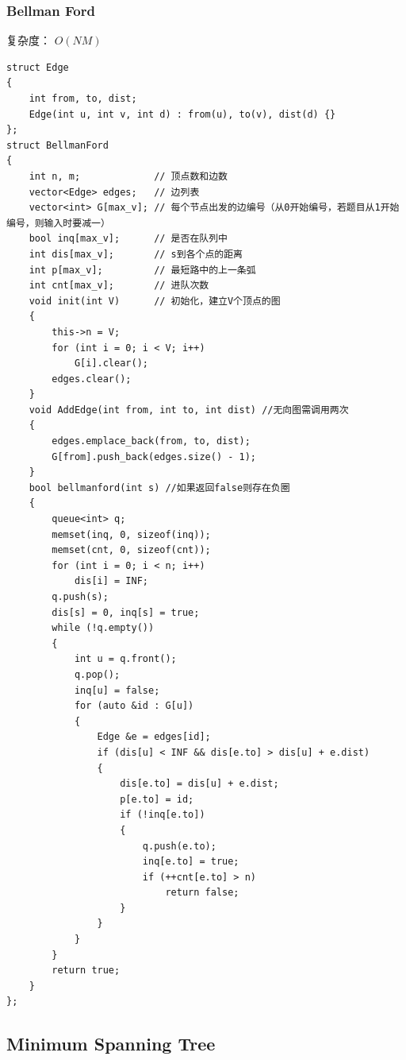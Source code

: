 \documentclass[twoside]{article}
\begin{document}
\subsubsection{Bellman Ford}
复杂度： $O(NM)$
\begin{lstlisting}
struct Edge
{
    int from, to, dist;
    Edge(int u, int v, int d) : from(u), to(v), dist(d) {}
};
struct BellmanFord
{
    int n, m;             // 顶点数和边数
    vector<Edge> edges;   // 边列表
    vector<int> G[max_v]; // 每个节点出发的边编号（从0开始编号，若题目从1开始编号，则输入时要减一）
    bool inq[max_v];      // 是否在队列中
    int dis[max_v];       // s到各个点的距离
    int p[max_v];         // 最短路中的上一条弧
    int cnt[max_v];       // 进队次数
    void init(int V)      // 初始化，建立V个顶点的图
    {
        this->n = V;
        for (int i = 0; i < V; i++)
            G[i].clear();
        edges.clear();
    }
    void AddEdge(int from, int to, int dist) //无向图需调用两次
    {
        edges.emplace_back(from, to, dist);
        G[from].push_back(edges.size() - 1);
    }
    bool bellmanford(int s) //如果返回false则存在负圈
    {
        queue<int> q;
        memset(inq, 0, sizeof(inq));
        memset(cnt, 0, sizeof(cnt));
        for (int i = 0; i < n; i++)
            dis[i] = INF;
        q.push(s);
        dis[s] = 0, inq[s] = true;
        while (!q.empty())
        {
            int u = q.front();
            q.pop();
            inq[u] = false;
            for (auto &id : G[u])
            {
                Edge &e = edges[id];
                if (dis[u] < INF && dis[e.to] > dis[u] + e.dist)
                {
                    dis[e.to] = dis[u] + e.dist;
                    p[e.to] = id;
                    if (!inq[e.to])
                    {
                        q.push(e.to);
                        inq[e.to] = true;
                        if (++cnt[e.to] > n)
                            return false;
                    }
                }
            }
        }
        return true;
    }
};
\end{lstlisting}
\subsection{Minimum Spanning Tree}
\end{document}
